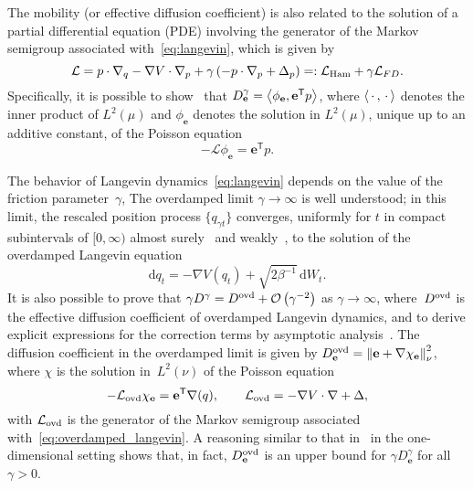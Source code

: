 \documentclass[11pt,a4paper]{article}
\newcommand{\laplacian}{\Delta}
\newcommand{\dummy}{\,\cdot\,}
\newcommand{\grad}{\nabla}
\newcommand{\vect}[1]{\boldsymbol{\mathbf #1}}
\renewcommand{\d}{\mathrm d}
\renewcommand{\t}{\mathsf T}
\theoremstyle{plain}
\numberwithin{equation}{section}
\begin{document}
The mobility (or effective diffusion coefficient)
is also related to the solution of a partial differential equation (PDE) involving the generator of the Markov semigroup associated with~\eqref{eq:langevin},
which is given by
\begin{equation}
    \label{eq:decomposition_generator}
    \mathcal L
    = p \cdot \grad_q - \grad V \cdot \grad_p + \gamma \left( - p \cdot \grad_p + \laplacian_p \right)
    =: \mathcal L_{\rm Ham} + \gamma \mathcal L_{FD}.
\end{equation}
Specifically, it is possible to  show~\cite{pavliotis2008multiscale,MR3509213} that $D^{\gamma}_{\vect e} = \ip{\phi_{\vect e}}{\vect e^\t p}$,
where $\ip{\dummy}{\dummy}$ denotes the inner product of $L^2(\mu)$ and $\phi_{\vect e}$ denotes the solution in $L^2(\mu)$,
unique up to an additive constant,
of the Poisson equation
\begin{equation}
    \label{eq:poisson_equation}
    - \mathcal L \phi_{\vect e} = \vect e^\t p.
\end{equation}

The behavior of Langevin dynamics~\eqref{eq:langevin} depends on the value of the friction parameter~$\gamma$,
The overdamped limit $\gamma \to \infty$ is well understood;
in this limit, the rescaled position process $\{q_{\gamma t}\}$
converges, uniformly for $t$ in compact subintervals of $[0, \infty)$ almost surely~\cite{MR0214150} and weakly~\cite{MR4054345},
to the solution of the overdamped Langevin equation
\begin{equation}
    \label{eq:overdamped_langevin}
    \d q_t = - \grad V(q_t) + \sqrt{2 \beta^{-1}} \, \d W_t.
\end{equation}
It is also possible to prove that $\gamma D^{\gamma} = D^{\rm ovd} + \bigo{\gamma^{-2}}$ as $\gamma \to \infty$,
where~$D^{\rm ovd}$ is the effective diffusion coefficient of overdamped Langevin dynamics,
and to derive explicit expressions for the correction terms by asymptotic analysis~\cite{MR2394704}.
The diffusion coefficient in the overdamped limit is given by $D^{\rm ovd}_{\vect e} = \norm{\vect e + \grad \chi_{\vect e}}[\nu]^2$,
where $\chi$ is the solution in~$L^2(\nu)$ of the Poisson equation
\[
    - \mathcal L_{\rm ovd} \chi_{\vect e} = \vect e^\t \grad(q), \qquad \mathcal L_{\rm ovd} = - \grad V \cdot \grad + \laplacian,
\]
with $\mathcal L_{\rm ovd}$ is the generator of the Markov semigroup associated with~\eqref{eq:overdamped_langevin}.
A reasoning similar to that in~\cite[Proposition 4.1]{MR2394704} in the one-dimensional setting shows that,
in fact, $D^{\rm ovd}_{\vect e}$ is an upper bound for $\gamma D^{\gamma}_{\vect e}$ for all $\gamma > 0$.
\end{document}
